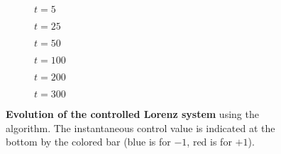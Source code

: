 \begin{figure}
\centering

\begin{subfigure}[t]{.3\textwidth}
	\centering
    	\caption{$t=5$}
	\label{fig:rayleigh_field_0}
\end{subfigure} \quad
\begin{subfigure}[t]{.3\textwidth}
	\centering
    	\caption{$t=25$}
	\label{fig:rayleigh_field_2}
\end{subfigure} \quad
\begin{subfigure}[t]{.3\textwidth}
	\centering
    	\caption{$t=50$}
	\label{fig:rayleigh_field_4}
\end{subfigure}

\medskip

\begin{subfigure}[t]{.3\textwidth}
	\centering
    	\caption{$t=100$}
	\label{fig:rayleigh_field_8}
\end{subfigure} \quad
\begin{subfigure}[t]{.3\textwidth}
	\centering
    	\caption{$t=200$}
	\label{fig:rayleigh_field_10}
\end{subfigure} \quad
\begin{subfigure}[t]{.3\textwidth}
	\centering
    	\caption{$t=300$}
	\label{fig:rayleigh_field_12}
\end{subfigure}

\caption{\textbf{Evolution of the controlled Lorenz system} using the \ppo algorithm. The instantaneous control value is indicated at the bottom by the colored bar (blue is for $-1$, red is for $+1$).}
\label{fig:lorenz_fields}
\end{figure} 
